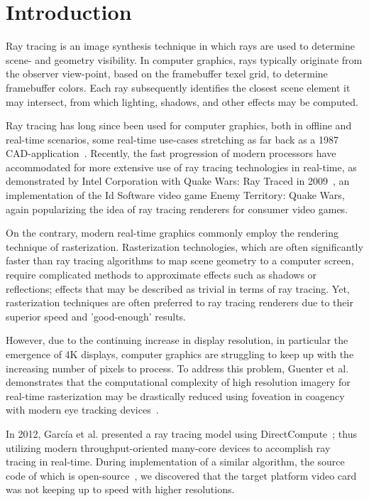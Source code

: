 \section{Introduction}
Ray tracing is an image synthesis technique in which rays are used to determine scene- and geometry visibility.
In computer graphics, rays typically originate from the observer view-point, based on the framebuffer texel grid, to determine framebuffer colors.
Each ray subsequently identifies the closest scene element it may intersect, from which lighting, shadows, and other effects may be computed.

Ray tracing has long since been used for computer graphics, both in offline and real-time scenarios, some real-time use-cases stretching as far back as a 1987 CAD-application~\cite{stay87}.
Recently, the fast progression of modern processors have accommodated for more extensive use of ray tracing technologies in real-time, as demonstrated by Intel Corporation with Quake Wars: Ray Traced in 2009~\cite{pohl09}, an implementation of the Id Software video game Enemy Territory: Quake Wars, again popularizing the idea of ray tracing renderers for consumer video games.

On the contrary, modern real-time graphics commonly employ the rendering technique of rasterization.
Rasterization technologies, which are often significantly faster than ray tracing algorithms to map scene geometry to a computer screen, require complicated methods to approximate effects such as shadows or reflections; effects that may be described as trivial in terms of ray tracing.
Yet, rasterization techniques are often preferred to ray tracing renderers due to their superior speed and 'good-enough' results.

However, due to the continuing increase in display resolution, in particular the emergence of 4K displays, computer graphics are struggling to keep up with the increasing number of pixels to process.
To address this problem, Guenter et al. demonstrates that the computational complexity of high resolution imagery for real-time rasterization may be drastically reduced using foveation in coagency with modern eye tracking devices~\cite{guenter12}.

In 2012, Garc\'ia et al. presented a ray tracing model using DirectCompute~\cite{garcia12}; thus utilizing modern throughput-oriented many-core devices to accomplish ray tracing in real-time.
During implementation of a similar algorithm, the source code of which is open-source~\cite{raytracer}, we discovered that the target platform video card was not keeping up to speed with higher resolutions.

